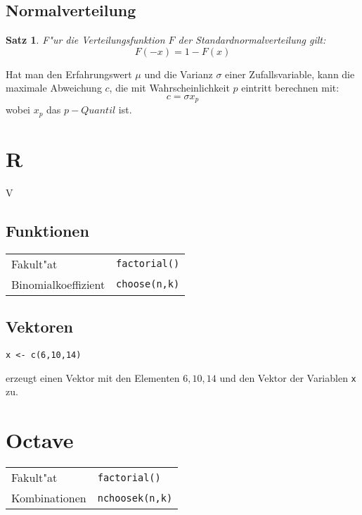\documentclass[ngerman, a4paper, 10pt, twocolumn, DIV20, headings=small]{scrartcl}
\newtheorem{satz}{Satz}
\begin{document}
\subsection{Normalverteilung}
\label{sec:normalverteilung}

\begin{satz}
  F"ur die Verteilungsfunktion $F$ der Standardnormalverteilung gilt:
\[
F(-x) = 1 - F(x)
\]
\end{satz}

Hat man den Erfahrungswert $\mu$ und die Varianz $\sigma$ einer Zufallsvariable, kann die maximale Abweichung $c$, die mit Wahrscheinlichkeit $p$ eintritt berechnen mit:
\[
 c = \sigma x_p
\]
wobei $x_p$ das $p-Quantil$ ist.
\section{R}
\label{sec:r}

V

\subsection{Funktionen}
\label{sec:r-funktionen}

\begin{tabular}{l l}
  Fakult"at & \verb|factorial()| \\
  Binomialkoeffizient & \verb|choose(n,k)| \\
\end{tabular}

\subsection{Vektoren}
\label{sec:r-vektoren}

\begin{verbatim}
x <- c(6,10,14)
\end{verbatim}
erzeugt einen Vektor mit den Elementen $6, 10, 14$ und den Vektor der Variablen \verb|x| zu.

\section{Octave}
\label{sec:octave}

\begin{tabular}{l l}
  Fakult"at & \verb|factorial()| \\
  Kombinationen & \verb|nchoosek(n,k)| \\
\end{tabular}
\end{document}
